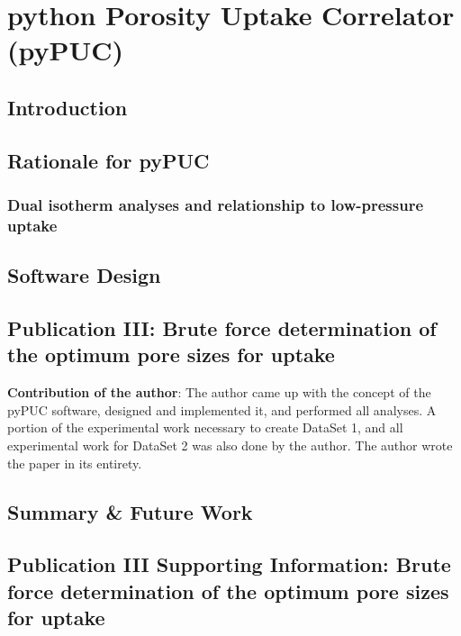 \chapter{python Porosity Uptake Correlator (pyPUC)}
\label{ch:pyPUC}

\section{Introduction}

\section{Rationale for pyPUC}
\subsection{Dual isotherm analyses and relationship to low-pressure  uptake}

\section{Software Design}

\newpage
\section[Publication III]{Publication III: Brute force determination of the optimum pore sizes for
 uptake}

\textbf{Contribution of the author}: The author came up with the concept of the pyPUC software, designed and implemented it, and performed all analyses. A portion of the experimental work necessary to create DataSet 1, and all experimental work for DataSet 2 was also done by the author. The author wrote the paper in its entirety.

\newpage

\setlength{\originalVOffset}{\voffset}   
\setlength{\originalHOffset}{\hoffset}

\setlength{\voffset}{0cm}
\setlength{\hoffset}{0cm}

\setlength{\voffset}{\originalVOffset}
\setlength{\hoffset}{\originalHOffset}

\section{Summary \& Future Work}

\section[Publication III Supporting Information]{Publication III Supporting Information: Brute force determination of the optimum pore sizes for  uptake}

